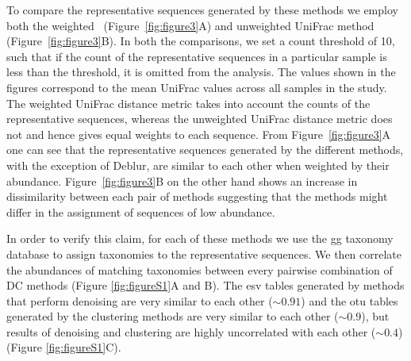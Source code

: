   To compare the representative sequences generated by these methods we employ both the weighted~\cite{Lozupone2007} (Figure~\ref{fig:figure3}A) and unweighted UniFrac method~\cite{Lozupone2005} (Figure~\ref{fig:figure3}B).
  In both the comparisons, we set a count threshold of 10, such that if the count of the representative sequences in a particular sample is less than the threshold, it is omitted from the analysis.
  The values shown in the figures correspond to the mean UniFrac values across all samples in the study.
  The weighted UniFrac distance metric takes into account the counts of the representative sequences, whereas the unweighted UniFrac distance metric does not and hence gives equal weights to each sequence.
  From Figure~\ref{fig:figure3}A one can see that the representative sequences generated by the different methods, with the exception of Deblur, are similar to each other when weighted by their abundance.
  Figure~\ref{fig:figure3}B on the other hand shows an increase in dissimilarity between each pair of methods suggesting that the methods might differ in the assignment of sequences of low abundance.

  In order to verify this claim, for each of these methods we use the \ac{gg} taxonomy database to assign taxonomies to the representative sequences.
  We then correlate the abundances of matching taxonomies between every pairwise combination of DC methods (Figure \ref{fig:figureS1}A and B).
  The \ac{esv} tables generated by methods that perform denoising are very similar to each other ($\sim0.91$) and the \ac{otu} tables generated by the clustering methods are very similar to each other ($\sim0.9$), but results of denoising and clustering are highly uncorrelated with each other ($\sim0.4$) (Figure \ref{fig:figureS1}C).


